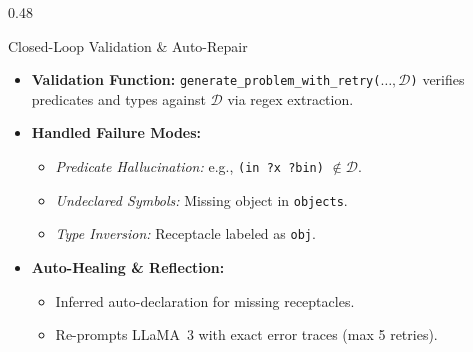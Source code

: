 \documentclass[10pt]{beamer}
\begin{document}
\begin{frame}[t]
\begin{columns}[T]
        \begin{column}{0.48\textwidth}
            \begin{block}{Closed-Loop Validation \& Auto-Repair}
                \begin{itemize}\scriptsize
                    \setlength\itemsep{0.10em}
                    \item \textbf{Validation Function:}
                    \newline \texttt{generate\_problem\_with\_retry($\dots, \mathcal{D}$)} verifies predicates and types against $\mathcal{D}$ via regex extraction.
                    \item \textbf{Handled Failure Modes:}
                    \begin{itemize}\scriptsize
                        \setlength\itemsep{0.02em}
                        \item \textit{Predicate Hallucination:} e.g., \texttt{(in ?x ?bin)} $\notin \mathcal{D}$.
                        \item \textit{Undeclared Symbols:} Missing object in \texttt{objects}.
                        \item \textit{Type Inversion:} Receptacle labeled as \texttt{obj}.
                    \end{itemize}
                    \item \textbf{Auto-Healing \& Reflection:}
                    \begin{itemize}\scriptsize
                        \setlength\itemsep{0.02em}
                        \item Inferred auto-declaration for missing receptacles.
                        \item Re-prompts LLaMA~3 with exact error traces (max 5 retries).
                    \end{itemize}
                \end{itemize}
            \end{block}
        \end{column}
    \end{columns}
\end{frame}
\end{document}
